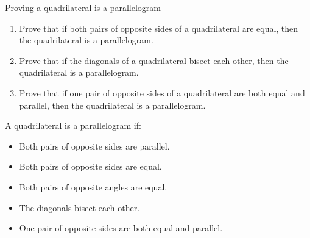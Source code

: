 \begin{Investigation}{Proving a quadrilateral is a parallelogram}
 \begin{enumerate}[label=\textbf{\arabic*}.]
 \item Prove that if both pairs of opposite sides of a quadrilateral are equal, then the quadrilateral is a parallelogram.
 \item Prove that if the diagonals of a quadrilateral bisect each other, then the quadrilateral is a parallelogram.
 \item Prove that if one pair of opposite sides of a quadrilateral are both equal and parallel, then the quadrilateral is a parallelogram.
 \end{enumerate}
\end{Investigation}


\par    
A quadrilateral is a parallelogram if:
\begin{itemize}[noitemsep]
 \item Both pairs of opposite sides are parallel.
 \item Both pairs of opposite sides are equal.
 \item Both pairs of opposite angles are equal.
 \item The diagonals bisect each other.
 \item One pair of opposite sides are both equal and parallel.
\end{itemize}

